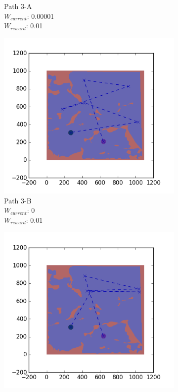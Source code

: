 \documentclass{tamuccthesis}
\begin{document}
\begin{figure}
\begin{subfigure}[b]{0.24\textwidth}
        \caption[]{{\small Path 3-A \\ $W_{current}$: 0.00001 \\ $W_{reward}$: 0.01}}   
        \label{fig:Path_3-A_upReward_Work}
    \end{subfigure}
    \begin{subfigure}[b]{0.24\textwidth}
        \centering
        \includegraphics[width=\textwidth,trim={4cm 3cm 2cm 3cm},clip]{EXP3RG_PathCb_-1_-1_0_0d01.png}
        \caption[]{{\small Path 3-B \\ $W_{current}$: 0 \\ $W_{reward}$: 0.01}}    
        \label{fig:Path_3-B_upReward_noWork}
    \end{subfigure}
    \begin{subfigure}[b]{0.24\textwidth}  
        \centering 
        \includegraphics[width=\textwidth,trim={4cm 3cm 2cm 3cm},clip]{EXP3RG_PathCb_-1_-1_-1_0d01.png}

\end{subfigure}
\end{figure}
\end{document}
